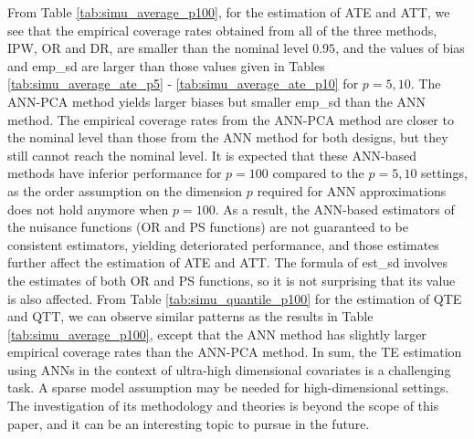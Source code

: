 \documentclass[11pt]{article}
\numberwithin{equation}{section}
\begin{document}
From Table \ref{tab:simu_average_p100}, for the estimation of ATE and ATT, we see that the empirical coverage rates obtained from all of the three methods, IPW, OR and DR, are smaller than the nominal level $0.95$, and the values of bias and emp\_sd are larger than those values given in Tables \ref{tab:simu_average_ate_p5} -  \ref{tab:simu_average_ate_p10} for $p=5,10$. The ANN-PCA method yields larger biases but smaller emp\_sd than the ANN method. The empirical coverage rates from the ANN-PCA method are closer to the nominal level than those from the ANN method for both designs, but they still cannot reach the nominal level. It is expected that these ANN-based methods have inferior performance for $p=100$ compared to the $p=5,10$ settings, as the order assumption on the dimension $p$ required for ANN approximations does not hold anymore when $p=100$. As a result, the ANN-based estimators of the nuisance functions (OR and PS functions) are not guaranteed to be consistent estimators, yielding deteriorated performance, and those estimates further affect the estimation of ATE and ATT. The formula of est\_sd involves the estimates of both OR and PS functions, so it is not surprising that its value is also affected. From Table \ref{tab:simu_quantile_p100} for the estimation of QTE and QTT, we can observe similar patterns as the results in Table \ref{tab:simu_average_p100}, except that the ANN method has slightly larger empirical coverage rates than the ANN-PCA method. In sum, the TE estimation using ANNs in the context of ultra-high dimensional covariates is a challenging task. A sparse model assumption may be needed for high-dimensional settings.   The investigation of its methodology and theories is beyond the scope of this paper, and it can be an interesting topic to pursue in the future.
\end{document}
